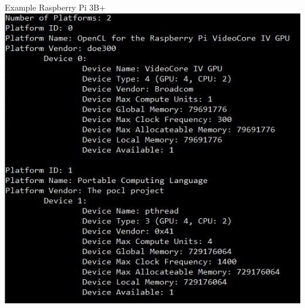 \documentclass{beamer}
\begin{document}
\begin{frame}{Example Raspberry Pi 3B+}
    \includegraphics[height=.8\textheight]{res/RaspberryPiData.PNG}
\end{frame}
\end{document}
